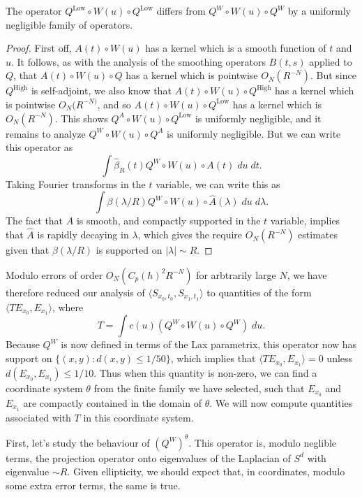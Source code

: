 \begin{lemma}
    The operator $Q^{\text{Low}} \circ W(u) \circ Q^{\text{Low}}$ differs from $Q^W \circ W(u) \circ Q^W$ by a uniformly negligible family of operators.
\end{lemma}
\begin{proof}
    First off, $A(t) \circ W(u)$ has a kernel which is a smooth function of $t$ and $u$. It follows, as with the analysis of the smoothing operators $B(t,s)$ applied to $Q$, that $A(t) \circ W(u) \circ Q$ has a kernel which is pointwise $O_N(R^{-N})$. But since $Q^{\text{High}}$ is self-adjoint, we also know that $A(t) \circ W(u) \circ Q^{\text{High}}$ has a kernel which is pointwise $O_N(R^{-N)}$, and so $A(t) \circ W(u) \circ Q^{\text{Low}}$ has a kernel which is $O_N(R^{-N})$. This shows $Q^A \circ W(u) \circ Q^{\text{Low}}$ is uniformly negligible, and it remains to analyze $Q^W \circ W(u) \circ Q^A$ is uniformly negligible. But we can write this operator as
    \[ \int \widehat{\beta}_R(t) Q^W \circ W(u) \circ A(t)\; du\; dt. \]
    Taking Fourier transforms in the $t$ variable, we can write this as
    \[ \int \beta(\lambda / R) Q^W \circ W(u) \circ \widehat{A}(\lambda)\; du\; d\lambda. \]
    The fact that $A$ is smooth, and compactly supported in the $t$ variable, implies that $\widehat{A}$ is rapidly decaying in $\lambda$, which gives the require $O_N(R^{-N})$ estimates given that $\beta(\lambda / R)$ is supported on $|\lambda| \sim R$.
\end{proof}

Modulo errors of order $O_N(C_p(h)^2 R^{-N})$ for arbtrarily large $N$, we have therefore reduced our analysis of $\langle {S\!}_{x_0,t_0}, {S\!}_{x_1,t_1} \rangle$ to quantities of the form $\langle T E_{x_0}, E_{x_1} \rangle$, where
%
\[ T = \int c(u) (Q^W \circ W(u) \circ Q^W)\; du. \]
%
Because $Q^W$ is now defined in terms of the Lax parametrix, this operator now has support on $\{ (x,y): d(x,y) \leq 1/50 \}$, which implies that $\langle T E_{x_0}, E_{x_1} \rangle = 0$ unless $d(E_{x_0}, E_{x_1}) \leq 1/10$. Thus when this quantity is non-zero, we can find a coordinate system $\theta$ from the finite family we have selected, such that $E_{x_0}$ and $E_{x_1}$ are compactly contained in the domain of $\theta$. We will now compute quantities associated with $T$ in this coordinate system.

First, let's study the behaviour of $(Q^W)^\theta$. This operator is, modulo neglible terms, the projection operator onto eigenvalues of the Laplacian of $S^d$ with eigenvalue $\sim R$. Given ellipticity, we should expect that, in coordinates, modulo some extra error terms, the same is true.

